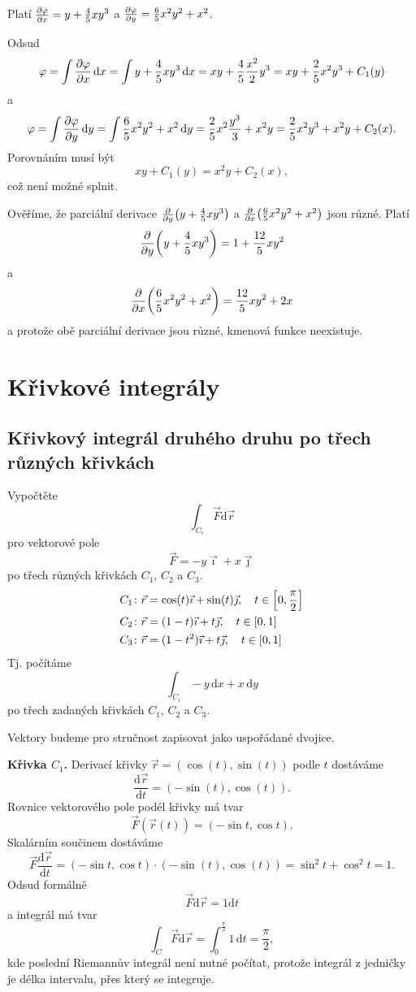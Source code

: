 \reseni

Platí $\pdv {\varphi}{x}=y+\frac 45 xy^3$ a $\pdv{\varphi}{y}=\frac 65 x^2y^2+x^2$.

Odsud
$$\varphi =\int \pdv{\varphi}{x} \,\mathrm dx=\int y+\frac 45 xy^3 \,\mathrm dx
=xy+\frac 45 \frac {x^2}{2}y^3=xy+\frac 25 x^2y^3+C_1(y)$$
a
$$\varphi =\int \pdv{\varphi}{y} \,\mathrm dy=\int \frac 65 x^2y^2 +x^2 \,\mathrm dy
=\frac 25 {x^2}\frac{y^3}3+x^2y=\frac 25 x^2y^3+x^2y+ C_2(x).$$
Porovnáním musí být
$$xy+C_1(y)=x^2y+C_2(x),$$
což není možné splnit.

Ověříme, že parciální derivace
$\pdv {y} \qty(y+\frac 45 xy^3)$ a $\pdv{x}\qty(\frac 65 x^2y^2+x^2)$ jsou různé.
Platí
$$\pdv {y} \qty(y+\frac 45 xy^3)=1+\frac{12}5xy^2$$
a
$$\pdv{x}\qty(\frac 65 x^2y^2+x^2)=\frac {12}5 xy^2+2x$$
a protože obě parciální derivace jsou různé, kmenová funkce neexistuje.

\konec

\newpage

\section{Křivkové integrály}

\nonstopmode

\subsection{Křivkový integrál druhého druhu po třech různých křivkách}


Vypočtěte $$\int_{C_i} \vec F \mathrm d\vec r$$ pro vektorové pole $$\vec F=-y\vec \imath + x\vec\jmath$$ po třech různých křivkách $C_1$, $C_2$ a $C_3$.
\begin{align*}
  C_1&\colon \vec r=\cos(t)\vec \imath + \sin (t)\vec\jmath, \quad t\in\qty[0,\frac\pi 2]\\
  C_2&\colon \vec r=(1-t)\vec \imath + t\vec\jmath, \quad t\in\qty[0,1]\\
  C_3&\colon \vec r=(1-t^2)\vec \imath + t\vec\jmath, \quad t\in\qty[0,1]
\end{align*}
Tj. počítáme
$$\int_{C_i} -y\,\mathrm dx + x\,\mathrm dy$$
po třech zadaných křivkách $C_1$, $C_2$ a $C_3$.

\reseni

Vektory budeme pro stručnost zapisovat jako uspořádané dvojice.

\stranka

\textbf{Křivka $C_1$.}
Derivací křivky $\vec r=(\cos(t),\sin(t))$ podle $t$ dostáváme
$$\frac{\mathrm d\vec r}{\mathrm dt}=(-\sin (t),\cos (t)).$$
Rovnice vektorového pole podél křivky má tvar
$$\vec F(\vec r(t))=(-\sin t,\cos t).$$
Skalárním součinem dostáváme
$$\vec F \frac{\mathrm d\vec r}{\mathrm dt}=
(-\sin t,\cos t)\cdot (-\sin (t),\cos (t)) = \sin^2 t+\cos^2 t =1.
$$
Odsud formálně $$\vec F\mathrm d\vec r=1\mathrm dt$$
a integrál má tvar
$$\int_C\vec F\mathrm d\vec r=\int_0^{\frac \pi 2}1\,\mathrm dt=\frac \pi 2,$$
kde poslední Riemannův integrál není nutné počítat, protože integrál z jedničky je délka intervalu, přes který se integruje.

